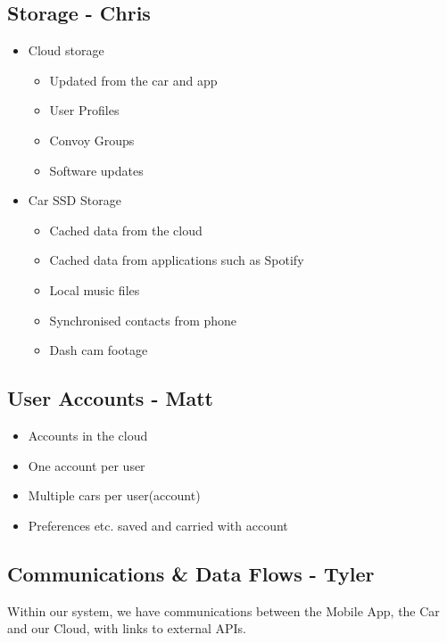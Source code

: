 \documentclass{article}
\begin{document}
\subsection{Storage - Chris}\label{ssec:storage}
  \begin{itemize}
      \item Cloud storage%
          \begin{itemize}
            \item Updated from the car and app
            \item User Profiles
            \item Convoy Groups
            \item Software updates
          \end{itemize}
      \item Car SSD Storage
      \begin{itemize}
        \item Cached data from the cloud
        \item Cached data from applications such as Spotify
        \item Local music files
        \item Synchronised contacts from phone
        \item Dash cam footage
      \end{itemize}
  \end{itemize}

\subsection{User Accounts - Matt}\label{ssec:user-accounts} 

  \begin{itemize}
   	\item Accounts in the cloud
    \item One account per user
    \item Multiple cars per user(account)
    \item Preferences etc. saved and carried with account 
 \end{itemize}
  
\subsection{Communications \& Data Flows - Tyler}\label{ssec:communications-data}
Within our system, we have communications between the Mobile App, the Car and our Cloud, with links to external APIs.
\end{document}
